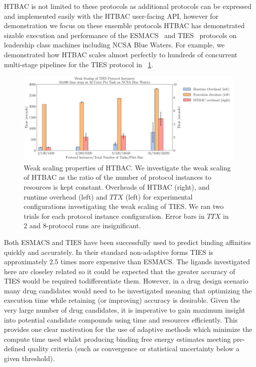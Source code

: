 \documentclass[conference]{IEEEtran}
\begin{document}
HTBAC is not limited to these protocols as additional protocols can be
expressed and implemented easily with the HTBAC user-facing API, however for
demonstration we focus on these ensemble protocols HTBAC has demonstrated
sizable execution and performance of the ESMACS~\cite{dakka2017} and TIES~\cite{dakka_farkaspall} protocols on leadership
class machines including NCSA Blue Waters. For example, we demonstrated how HTBAC
scales almost perfectly to hundreds of concurrent multi-stage pipelines for the TIES 
protocol in ~\ref{fig:weak_scaling}.

\begin{figure}
  \centering
   \includegraphics[width=\columnwidth]
   {weak_scaling_TIES_instances_50,000_timesteps_with_16_instances.pdf}
  \caption{Weak scaling properties of HTBAC. We investigate the
  weak scaling of HTBAC as the ratio of the number of protocol instances to
  resources is kept constant. Overheads of HTBAC (right), and runtime overhead 
  (left) and \(TTX\) (left) for experimental configurations investigating the 
  weak scaling of TIES. We ran two trials for each protocol instance 
  configuration. Error bars in \(TTX\) in 2 and 8-protocol runs are 
  insignificant.}
\label{fig:weak_scaling}
\end{figure}

Both ESMACS and TIES have been successfully used to predict binding affinities
quickly and accurately. 
In their standard non-adaptive forms TIES is approximately 2.5 times more expensive
than ESMACS.
The ligands investigated here are closeley related so it could be expected that the
greater accuracy of TIES would be required todifferentiate them.
However, in a drug design scenario many drug candidates would need to be investigated
meaning that optimizing the execution time while retaining (or improving) accuracy is
desirable. 
Given the very large number of drug candidates, it is imperative to
gain maximum insight into potential candidate compounds using time and
resources efficiently. 
This provides one clear motivation for the use of
adaptive methods which minimize the compute time used whilst producing binding
free energy estimates meeting pre-defined quality criteria (such as
convergence or statistical uncertainty below a given threshold).
\end{document}
